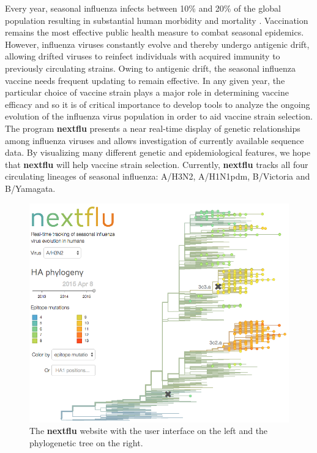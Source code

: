 \documentclass{bioinfo}
\newcommand{\nextflu}{\textbf{nextflu}}
\begin{document}

Every year, seasonal influenza infects between 10\% and 20\% of the global population resulting in substantial human morbidity and mortality \citep{flufactsheet}.
Vaccination remains the most effective public health measure to combat seasonal epidemics.
However, influenza viruses constantly evolve and thereby undergo antigenic drift, allowing drifted viruses to reinfect individuals with acquired immunity to previously circulating strains.
Owing to antigenic drift, the seasonal influenza vaccine needs frequent updating to remain effective.
In any given year, the particular choice of vaccine strain plays a major role in determining vaccine efficacy and so it is of critical importance to develop tools to analyze the ongoing evolution of the influenza virus population in order to aid vaccine strain selection.
The program \nextflu{} presents a near real-time display of genetic relationships among influenza viruses and allows investigation of currently available sequence data. By visualizing many different genetic and epidemiological features, we hope that \nextflu{} will help vaccine strain selection.
Currently, \nextflu{} tracks all four circulating lineages of seasonal influenza: A/H3N2, A/H1N1pdm, B/Victoria and B/Yamagata.

\begin{figure}[t!]
	\centering
	\includegraphics[width=0.99\columnwidth]{tree}
	\caption[]{The \nextflu{} website with the user interface on the left and the phylogenetic tree on the right.}
	\label{fig:tree}
\end{figure}
\end{document}
